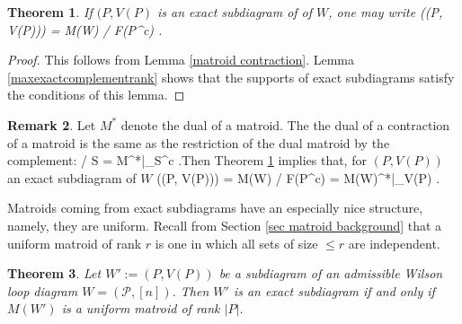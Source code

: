 \documentclass[11pt]{article}
\def\bas #1\eas{\begin{align*} #1 \end{align*}}
\newcommand{\cP}{\mathcal{P}}
\newtheorem{thm}{Theorem}[section]
\theoremstyle{remark}
\theoremstyle{definition}
\newtheorem{rmk}[thm]{Remark}
\begin{document}
\begin{thm} \label{exact diagrams contractions}
If $(P, V(P)$ is an exact subdiagram of of $W$, one may write \bas M\big((P, V(P))\big) = M(W)  / F(P^c) \;.\eas 
\end{thm}

\begin{proof}
This follows from Lemma \ref{matroid contraction}. Lemma \ref{maxexactcomplementrank} shows that the supports of exact subdiagrams satisfy the conditions of this lemma.
\end{proof}

\begin{rmk} \label{remark exact dual restiction}
Let $M^*$ denote the dual of a matroid. The the dual of a contraction of a matroid is the same as the restriction of the dual matroid by the complement: \bas M / S = M^*|_{S^c} \;.\eas Then Theorem \ref{exact diagrams contractions} implies that, for $(P, V(P))$ an exact subdiagram of $W$ \bas M\big((P, V(P))\big) = M(W)  / F(P^c) = M(W)^*|_{V(P)} \;.\eas
\end{rmk}

Matroids coming from exact subdiagrams have an especially nice structure, namely, they are uniform. Recall from Section \ref{sec matroid background} that a uniform matroid of rank $r$ is one in which all sets of size $ \leq r$ are independent.

\begin{thm} \label{exactuniformthm}
Let $W':= (P, V(P))$ be a subdiagram of an admissible Wilson loop diagram $W= (\cP, [n])$. Then $W'$ is an exact subdiagram if and only if $M(W')$ is a uniform matroid of rank $|P|$.
\end{thm}
\end{document}
